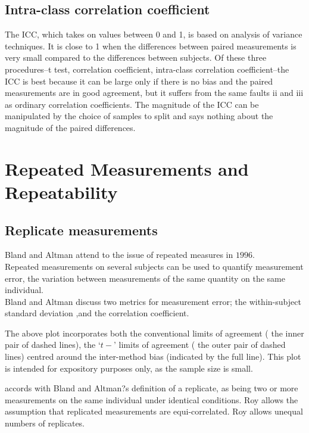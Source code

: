 \documentclass[12pt, a4paper]{report}
\theoremstyle{plain}
\theoremstyle{definition}
\theoremstyle{remark}
\begin{document}
	\section*{Intra-class correlation coefficient}
 
	The ICC, which takes on values between 0 and 1, is based on analysis of variance techniques. It is close to 1 when the differences between paired measurements is very small compared to the differences between subjects. Of these three procedures--t test, correlation coefficient, intra-class correlation coefficient--the ICC is best because it can be large only if there is no bias and the paired measurements are in good agreement, but it suffers from the same faults ii and iii as ordinary correlation coefficients. The magnitude of the ICC can be manipulated by the choice of samples to split and says nothing about the magnitude of the paired differences.


	



\chapter{Repeated Measurements and Repeatability}
	
	
	
	\section{Replicate measurements}
	Bland and Altman attend to the issue of repeated measures in
	$1996$.
	\\
	Repeated measurements on several subjects can be used to quantify
	measurement error, the variation between measurements of the same
	quantity on the same individual.
	\\
	Bland and Altman discuss two metrics for measurement error; the
	within-subject standard deviation ,and the correlation
	coefficient.
	
	The above plot incorporates both the conventional limits of
	agreement ( the inner pair of dashed lines), the `$t-$' limits of
	agreement ( the outer pair of dashed lines) centred around the
	inter-method bias (indicated by the full line). This plot is
	intended for expository purposes only, as the sample size is
	small.
	
	\citet{ARoy2009} accords with Bland and Altman?s definition of a replicate, as being two or more measurements on the same individual under identical conditions.
	Roy allows the assumption that replicated measurements are equi-correlated.
	Roy allows unequal numbers of replicates.
	
\end{document}
